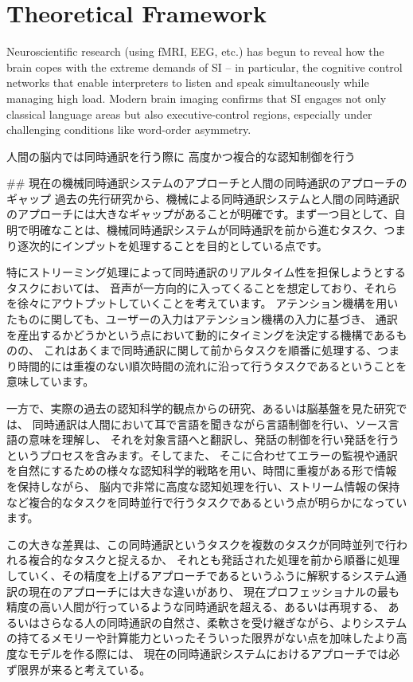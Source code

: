 \section{Theoretical Framework}

Neuroscientific research (using fMRI, EEG, etc.) has begun to reveal how the brain copes with the extreme demands of SI – in particular, the cognitive control networks that enable interpreters to listen and speak simultaneously while managing high load. Modern brain imaging confirms that SI engages not only classical language areas but also executive-control regions, especially under challenging conditions like word-order asymmetry.

人間の脳内では同時通訳を行う際に
高度かつ複合的な認知制御を行う

## 現在の機械同時通訳システムのアプローチと人間の同時通訳のアプローチのギャップ
過去の先行研究から、機械による同時通訳システムと人間の同時通訳のアプローチには大きなギャップがあることが明確です。まず一つ目として、自明で明確なことは、機械同時通訳システムが同時通訳を前から進むタスク、つまり逐次的にインプットを処理することを目的としている点です。

特にストリーミング処理によって同時通訳のリアルタイム性を担保しようとするタスクにおいては、
音声が一方向的に入ってくることを想定しており、それらを徐々にアウトプットしていくことを考えています。
アテンション機構を用いたものに関しても、ユーザーの入力はアテンション機構の入力に基づき、
通訳を産出するかどうかという点において動的にタイミングを決定する機構であるものの、
これはあくまで同時通訳に関して前からタスクを順番に処理する、つまり時間的には重複のない順次時間の流れに沿って行うタスクであるということを意味しています。

一方で、実際の過去の認知科学的観点からの研究、あるいは脳基盤を見た研究では、
同時通訳は人間において耳で言語を聞きながら言語制御を行い、ソース言語の意味を理解し、
それを対象言語へと翻訳し、発話の制御を行い発話を行うというプロセスを含みます。そしてまた、
そこに合わせてエラーの監視や通訳を自然にするための様々な認知科学的戦略を用い、時間に重複がある形で情報を保持しながら、
脳内で非常に高度な認知処理を行い、ストリーム情報の保持など複合的なタスクを同時並行で行うタスクであるという点が明らかになっています。

この大きな差異は、この同時通訳というタスクを複数のタスクが同時並列で行われる複合的なタスクと捉えるか、
それとも発話された処理を前から順番に処理していく、その精度を上げるアプローチであるというふうに解釈するシステム通訳の現在のアプローチには大きな違いがあり、
現在プロフェッショナルの最も精度の高い人間が行っているような同時通訳を超える、あるいは再現する、
あるいはさらなる人の同時通訳の自然さ、柔軟さを受け継ぎながら、よりシステムの持てるメモリーや計算能力といったそういった限界がない点を加味したより高度なモデルを作る際には、
現在の同時通訳システムにおけるアプローチでは必ず限界が来ると考えている。


